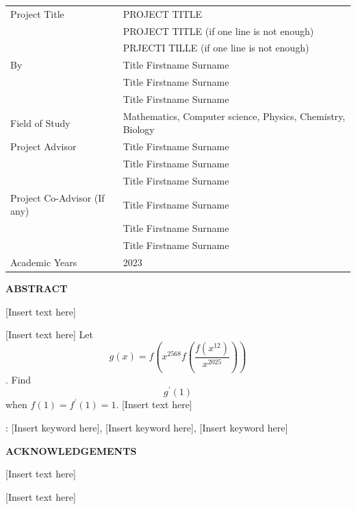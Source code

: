 \documentclass[12pt,a4paper,oneside]{book}
\theoremstyle{plain}
\numberwithin{equation}{chapter} \DeclareMathOperator{\Var}{Var}
\begin{document}
\newpage
{}
\begin{table}[h]
	\begin{tabular}{ll}
		Project Title								   & PROJECT TITLE  \\
										 					&PROJECT TITLE (if one line is not enough) \\
										 					& PRJECTI TILLE (if one line is not enough) \\
		By							   					  & Title Firstname Surname \\
															& Title Firstname Surname \\
															& Title Firstname Surname \\
		Field of Study			  					 & Mathematics, Computer science, Physics, Chemistry,
Biology
\\
		Project Advisor								& Title Firstname Surname \\
															& Title Firstname Surname \\
															& Title Firstname Surname \\
		Project Co-Advisor (If any)			  & Title Firstname Surname \\
															& Title Firstname Surname \\
															& Title Firstname Surname \\
		Academic Years							  & 2023 \\
	\end{tabular}
\end{table}
\begin{center}
  \large{\textbf{ABSTRACT}}\\
\end{center}

[Insert text here]

[Insert text here]
Let \[g(x) = f \left( x^{2568} f \left( \frac{f \left( x^{12} \right)}{x^{2025}} \right) \right)\]. Find \[g^{'}(1)\] when $f(1) = f^{'}(1) = 1$.
[Insert text here]

 : [Insert keyword here], [Insert keyword here], [Insert keyword here]

\newpage
\begin{center}
	\large{\textbf{ACKNOWLEDGEMENTS}} \\
\end{center}

[Insert text here]

[Insert text here]
\end{document}
